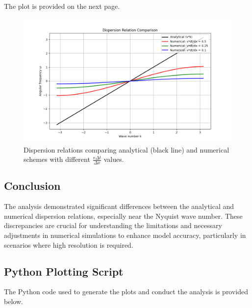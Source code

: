 \documentclass{article}
\begin{document}
\vspace{3mm}
The plot is provided on the next page.

\newpage

\begin{figure}[!]
    \centering
    \includegraphics[width=1\textwidth]{materials/Figure_1.png}
    \caption{Dispersion relations comparing analytical (black line) and numerical schemes with different \( \frac{v\Delta t}{\Delta x} \) values.}
    \label{fig:dispersion_relations}
\end{figure}

\subsection{Conclusion}
The analysis demonstrated significant differences between the analytical and numerical dispersion relations, especially near the Nyquist wave number. These discrepancies are crucial for understanding the limitations and necessary adjustments in numerical simulations to enhance model accuracy, particularly in scenarios where high resolution is required.

\subsection{Python Plotting Script}
The Python code used to generate the plots and conduct the analysis is provided below.
\end{document}
